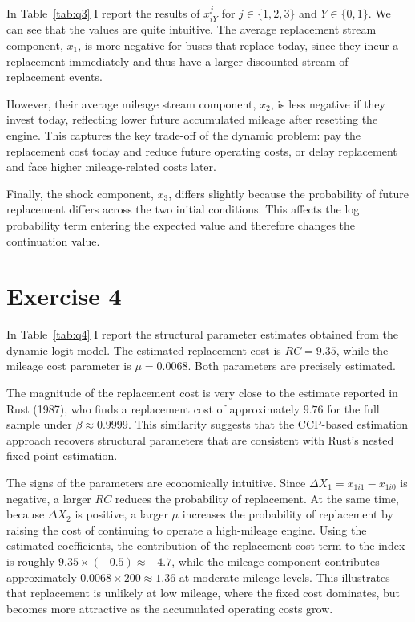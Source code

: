 \documentclass{article}
\begin{document}
In Table~\ref{tab:q3} I report the results of \( x_{iY}^{j} \) for \( j \in \{1,2,3\} \) and \( Y \in \{0,1\} \). We can see that the values are quite intuitive. The average replacement stream component, \( x_1 \), is more negative for buses that replace today, since they incur a replacement immediately and thus have a larger discounted stream of replacement events.

However, their average mileage stream component, \( x_2 \), is less negative if they invest today, reflecting lower future accumulated mileage after resetting the engine. This captures the key trade-off of the dynamic problem: pay the replacement cost today and reduce future operating costs, or delay replacement and face higher mileage-related costs later. 

Finally, the shock component, \( x_3 \), differs slightly because the probability of future replacement differs across the two initial conditions. This affects the log probability term entering the expected value and therefore changes the continuation value.

\section*{Exercise 4}

In Table~\ref{tab:q4} I report the structural parameter estimates obtained from the dynamic logit model. The estimated replacement cost is $RC = 9.35$, while the mileage cost parameter is $\mu = 0.0068$. Both parameters are precisely estimated.

The magnitude of the replacement cost is very close to the estimate reported in Rust (1987), who finds a replacement cost of approximately $9.76$ for the full sample under $\beta \approx 0.9999$. This similarity suggests that the CCP-based estimation approach recovers structural parameters that are consistent with Rust’s nested fixed point estimation.

The signs of the parameters are economically intuitive. Since $\Delta X_1 = x_{1i1} - x_{1i0}$ is negative, a larger $RC$ reduces the probability of replacement. At the same time, because $\Delta X_2$ is positive, a larger $\mu$ increases the probability of replacement by raising the cost of continuing to operate a high-mileage engine. Using the estimated coefficients, the contribution of the replacement cost term to the index is roughly $9.35 \times (-0.5) \approx -4.7$, while the mileage component contributes approximately $0.0068 \times 200 \approx 1.36$ at moderate mileage levels. This illustrates that replacement is unlikely at low mileage, where the fixed cost dominates, but becomes more attractive as the accumulated operating costs grow.
\end{document}
